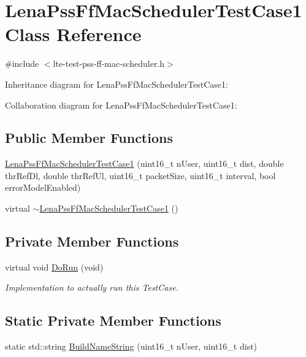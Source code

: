 \hypertarget{classLenaPssFfMacSchedulerTestCase1}{}\section{Lena\+Pss\+Ff\+Mac\+Scheduler\+Test\+Case1 Class Reference}
\label{classLenaPssFfMacSchedulerTestCase1}


{\ttfamily \#include $<$lte-\/test-\/pss-\/ff-\/mac-\/scheduler.\+h$>$}



Inheritance diagram for Lena\+Pss\+Ff\+Mac\+Scheduler\+Test\+Case1\+:


Collaboration diagram for Lena\+Pss\+Ff\+Mac\+Scheduler\+Test\+Case1\+:
\subsection*{Public Member Functions}
\begin{DoxyCompactItemize}
\item 
\hyperlink{classLenaPssFfMacSchedulerTestCase1_aa3a068f9a620f64413174afe4948dee6}{Lena\+Pss\+Ff\+Mac\+Scheduler\+Test\+Case1} (uint16\+\_\+t n\+User, uint16\+\_\+t dist, double thr\+Ref\+Dl, double thr\+Ref\+Ul, uint16\+\_\+t packet\+Size, uint16\+\_\+t interval, bool error\+Model\+Enabled)
\item 
virtual \hyperlink{classLenaPssFfMacSchedulerTestCase1_ab3269889117cc6a3257af3bb6a48da4c}{$\sim$\+Lena\+Pss\+Ff\+Mac\+Scheduler\+Test\+Case1} ()
\end{DoxyCompactItemize}
\subsection*{Private Member Functions}
\begin{DoxyCompactItemize}
\item 
virtual void \hyperlink{classLenaPssFfMacSchedulerTestCase1_a82b48ffdd476a2c0b5b111aaa2702fc9}{Do\+Run} (void)
\begin{DoxyCompactList}\small\item\em Implementation to actually run this Test\+Case. \end{DoxyCompactList}\end{DoxyCompactItemize}
\subsection*{Static Private Member Functions}
\begin{DoxyCompactItemize}
\item 
static std\+::string \hyperlink{classLenaPssFfMacSchedulerTestCase1_ab13dda6157b422e44c1262d7c6634043}{Build\+Name\+String} (uint16\+\_\+t n\+User, uint16\+\_\+t dist)
\end{DoxyCompactItemize}

